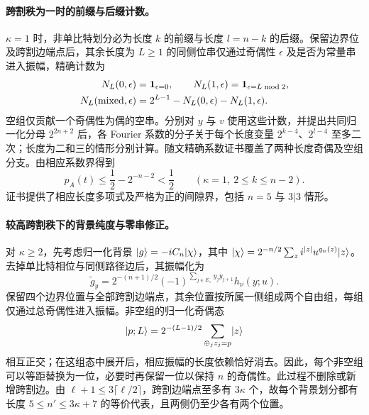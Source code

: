 \paragraph*{跨割秩为一时的前缀与后缀计数。}
$\kappa=1$ 时，非单比特划分必为长度 $k$ 的前缀与长度 $l=n-k$ 的后缀。保留边界位及跨割边端点后，其余长度为 $L\ge1$ 的同侧位串仅通过奇偶性 $\epsilon$ 及是否为常量串进入振幅，精确计数为
\begin{equation}
 \begin{aligned}
 N_L(0,\epsilon)&=\mathbf1_{\epsilon=0},\qquad
 N_L(1,\epsilon)=\mathbf1_{\epsilon=L\bmod2},\\
 N_L({\rm mixed},\epsilon)&=2^{L-1}-N_L(0,\epsilon)-N_L(1,\epsilon).
 \end{aligned}
 \label{physics:length-counts}
\end{equation}
空组仅贡献一个奇偶性为偶的空串。分别对 $y$ 与 $v$ 使用这些计数，并提出共同归一化分母 $2^{2n+2}$ 后，各 Fourier 系数的分子关于每个长度变量 $2^{k-4}$、$2^{l-4}$ 至多二次；长度为二和三的情形分别计算。随文精确系数证书覆盖了两种长度奇偶及空组分支。由相应系数界得到
\begin{equation}
 p_A(t)\le\frac12-2^{-n-2}<\frac12
 \qquad(\kappa=1,\ 2\le k\le n-2).
 \label{physics:rank-one-gaps}
\end{equation}
证书提供了相应长度多项式及严格为正的间隙界，包括 $n=5$ 与 $3|3$ 情形。

\paragraph*{较高跨割秩下的背景纯度与零串修正。}
对 $\kappa\ge2$，先考虑归一化背景 $\lvert g\rangle=-iC_n\lvert \chi\rangle$，其中 $\lvert \chi\rangle=2^{-n/2}\sum_z i^{|z|}u^{q_n(z)}\lvert z\rangle$。去掉单比特相位与同侧路径边后，其振幅化为
\begin{equation}
 \widetilde g_y=2^{-(n+1)/2}
 (-1)^{\sum_{j\in E_\times}y_jy_{j+1}}h_\nu(y;u).
 \label{physics:background-compression}
\end{equation}
保留四个边界位置与全部跨割边端点，其余位置按所属一侧组成两个自由组，每组仅通过总奇偶性进入振幅。非空组的归一化奇偶态
\begin{equation}
 \lvert p;L\rangle=2^{-(L-1)/2}\sum_{\oplus_jz_j=p}\lvert z\rangle
 \label{physics:parity-isometry}
\end{equation}
相互正交；在这组态中展开后，相应振幅的长度依赖恰好消去。因此，每个非空组可以等距替换为一位，必要时再保留一位以保持 $n$ 的奇偶性。此过程不删除或新增跨割边。由 $\ell+1\le3\lceil\ell/2\rceil$，跨割边端点至多有 $3\kappa$ 个，故每个背景划分都有长度 $5\le n'\le3\kappa+7$ 的等价代表，且两侧仍至少各有两个位置。

